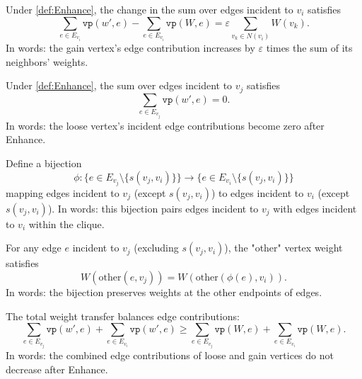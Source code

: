 \begin{lemma}
  \label{lem:Enhance_gain_sum}
  \leanok
Under \autoref{def:Enhance}, the change in the sum over edges incident to \(v_i\) satisfies
\[
\sum_{e \in E_{v_i}} \texttt{vp}(w', e) - \sum_{e \in E_{v_i}} \texttt{vp}(W, e) = \varepsilon \sum_{v_k \in N(v_i)} W(v_k).
\]
In words: the gain vertex's edge contribution increases by \(\varepsilon\) times the sum of its neighbors' weights.
\end{lemma}

\begin{lemma}
  \label{lem:Enhance_loose_sum}
  \leanok
Under \autoref{def:Enhance}, the sum over edges incident to \(v_j\) satisfies
\[
\sum_{e \in E_{v_j}} \texttt{vp}(w', e) = 0.
\]
In words: the loose vertex's incident edge contributions become zero after Enhance.
\end{lemma}

\begin{definition}
    \label{def:the_bij}
    \leanok
Define a bijection
\[
\phi: \{ e \in E_{v_j} \setminus \{s(v_j, v_i)\} \} \to \{ e \in E_{v_i} \setminus \{s(v_j, v_i)\} \}
\]
mapping edges incident to \(v_j\) (except \(s(v_j,v_i)\)) to edges incident to \(v_i\) (except \(s(v_j,v_i)\)).
In words: this bijection pairs edges incident to \(v_j\) with edges incident to \(v_i\) within the clique.
\end{definition}

\begin{lemma}
  \label{lem:the_bij_same}
  \leanok
For any edge \(e\) incident to \(v_j\) (excluding \(s(v_j, v_i)\)), the "other" vertex weight satisfies
\[
W(\mathrm{other}(e, v_j)) = W(\mathrm{other}(\phi(e), v_i)).
\]
In words: the bijection preserves weights at the other endpoints of edges.
\end{lemma}

\begin{lemma}
  \label{lem:Enhance_sum_loose_gain_equal}
  \leanok
The total weight transfer balances edge contributions:
\[
\sum_{e \in E_{v_j}} \texttt{vp}(w', e) + \sum_{e \in E_{v_i}} \texttt{vp}(w', e) \geq \sum_{e \in E_{v_j}} \texttt{vp}(W, e) + \sum_{e \in E_{v_i}} \texttt{vp}(W, e).
\]
In words: the combined edge contributions of loose and gain vertices do not decrease after Enhance.
\end{lemma}

